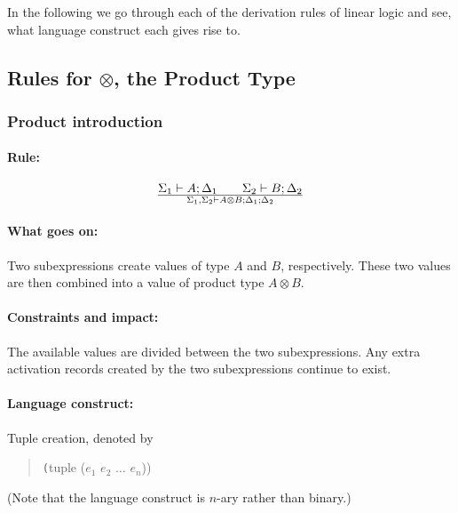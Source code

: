 \documentclass[a4paper]{article}
\begin{document}
In the following we go through each of the derivation rules of linear
logic and see, what language construct each gives rise to.

\subsection{Rules for $\otimes$, the Product Type}

\subsubsection{Product introduction}
\paragraph{Rule:}
$$
{
 {\Sigma_1 \vdash A;\Delta_1}
 \qquad
 {\Sigma_2 \vdash B;\Delta_2}
}\over{
 \Sigma_1, \Sigma_2 \vdash A \otimes B ; \Delta_1 ; \Delta_2
}
$$

\paragraph{What goes on:} Two subexpressions create values of type $A$
and $B$, respectively. These two values are then combined into a value
of product type $A \otimes B$.


\paragraph{Constraints and impact:} The available values are divided
between the two subexpressions.  Any extra activation records created
by the two subexpressions continue to exist.

\paragraph{Language construct:} Tuple creation, denoted by
\begin{quote}\texttt
  (tuple ($e_1$ $e_2$ $\ldots$ $e_n$))
\end{quote}
(Note that the language construct is $n$-ary rather than binary.)
\end{document}
